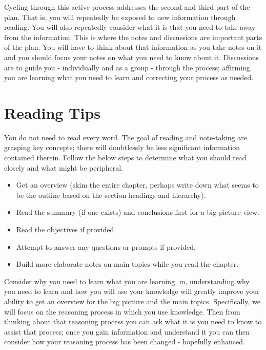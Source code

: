Cycling through this active process addresses the second and third part of the plan. That is, you will repeatedly be exposed to new information through reading. You will also repeatedly consider what it is that you need to take away from the information. This is where the notes and discussions are important parts of the plan. You will have to think about that information as you take notes on it and you should focus your notes on what you need to know about it. Discussions are to guide you - individually and as a group - through the process; affirming you are learning what you need to learn and correcting your process as needed.

\section{Reading Tips}

You do not need to read every word. The goal of reading and note-taking are grasping key concepts; there will doubtlessly be less significant information contained therein. Follow the below steps to determine what you should read closely and what might be peripheral.

\begin{itemize}
\item{Get an overview (skim the entire chapter, perhaps write down what seems to be the outline based on the section headings and hierarchy).}
\item{Read the summary (if one exists) and conclusions first for a big-picture view.}
\item{Read the objectives if provided.}
\item{Attempt to answer any questions or prompts if provided.}
\item{Build more elaborate notes on main topics while you read the chapter.}
\end{itemize}

Consider why you need to learn what you are learning. m, understanding why you need to learn and how you will use your knowledge will greatly improve your ability to get an overview for the big picture and the main topics. Specifically, we will focus on the reasoning process in which you use knowledge. Then from thinking about that reasoning process you can ask what it is you need to know to assist that process; once you gain information and understand it you can then consider how your reasoning process has been changed - hopefully enhanced.

